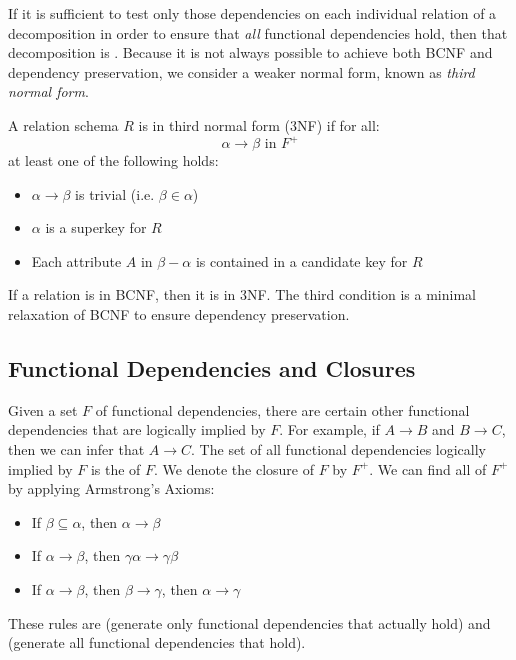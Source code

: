 \documentclass{article}
\begin{document}
If it is sufficient to test only those dependencies on each individual relation of a decomposition in order to ensure that \emph{all} functional dependencies hold, then that decomposition is . Because it is not always possible to achieve both BCNF and dependency preservation, we consider a weaker normal form, known as \emph{third normal form}. 

\begin{definition}
  A relation schema $R$ is in third normal form (3NF) if for all: $$\alpha \rightarrow \beta \textrm{ in } F^{+}$$ at least one of the following holds: 
  \begin{itemize}
    \item $\alpha \rightarrow \beta$ is trivial (i.e. $\beta \in \alpha$) 
    \item $\alpha$ is a superkey for $R$ 
    \item Each attribute $A$ in $\beta - \alpha$ is contained in a candidate key for $R$
  \end{itemize}
  If a relation is in BCNF, then it is in 3NF. The third condition is a minimal relaxation of BCNF to ensure dependency preservation. 
\end{definition}

\subsection{Functional Dependencies and Closures}

Given a set $F$ of functional dependencies, there are certain other functional dependencies that are logically implied by $F$. For example, if $A \rightarrow B$ and $B \rightarrow C$, then we can infer that $A \rightarrow C$. The set of all functional dependencies logically implied by $F$ is the  of $F$. We denote the closure of $F$ by $F^{+}$. We can find all of $F^{+}$ by applying Armstrong's Axioms: 
\begin{itemize}
  \item If $\beta \subseteq \alpha$, then $\alpha \rightarrow \beta$ \hfill {}
  \item If $\alpha \rightarrow \beta$, then $\gamma \alpha \rightarrow \gamma \beta$ \hfill {}
  \item If $\alpha \rightarrow \beta$, then $\beta \rightarrow \gamma$, then $\alpha \rightarrow \gamma$ \hfill {}
\end{itemize}
These rules are  (generate only functional dependencies that actually hold) and  (generate all functional dependencies that hold). \\
\end{document}
